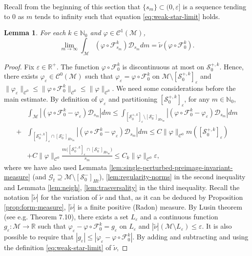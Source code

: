 \documentclass{amsart}
\numberwithin{equation}{section}
\newtheorem{lemma}[theorem]{Lemma}
\newcommand\ve{\varepsilon}
\newcommand\vf{\varphi}
\renewcommand{\le}{\leqslant}
\newcommand\cC{{\mathcal C}}
\newcommand\cF{{\mathcal F}}
\newcommand\cG{{\mathcal G}}
\newcommand\cM{{\mathcal M}}
\newcommand\cS{{\mathcal S}}
\newcommand\bN{{\mathbb N}}
\newcommand\bR{{\mathbb R}}
\newcommand{\Deriv}{\mathcal D}
\begin{document}
Recall from the beginning of this section that \(\{s_m\} \subset (0, \ve] \) is a sequence tending to \(0\) as \(m\) tends to infinity such that equation \eqref{eq:weak-star-limit} holds. 
\begin{lemma}\label{lem:limit-fixed-k}
For each \(k \in \bN_0\) and \(\vf \in \cC^1(\cM)\),
\[
   \lim_{m \to \infty} \int_{\cM} (\vf \circ \cF_{s_{m}}^k) \Deriv_{s_m} dm = \widetilde \nu (\vf \circ \cF_0^k).
\]
\end{lemma}
\begin{proof}
Fix \(\ve \in \bR^+\). The function \(\vf \circ \cF_0^k\) is discontinuous at most on \(\cS_0^{+,k}\). Hence, there exists \(\vf_{\ve} \in \cC^0(\cM)\) such that \(\vf_{\ve} = \vf \circ \cF_0^k\) on \(\cM \setminus [\cS_0^{+,k}]_{\ve}\) and \(\|\vf_{\ve}\|_{\cC^0} \le \|\vf \circ \cF_0^k\|_{\cC^0} \le \|\vf\|_{\cC^0}\). 
We need some considerations before the main estimate. By definition of \(\vf_{\ve}\) and partitioning \([\cS_0^{+,k}]_{\ve}\), for any \(m \in \bN_0\),
\begin{equation}\label{eq:support-lusin}
\begin{split}
& \int_{\cM} |(\vf \circ \cF_{0}^k - \vf_{\ve})\Deriv_{s_m}| dm \le \int_{[\cS_0^{+,k}]_{\ve} \setminus [\cS_0^{-}]_{Hs_m}} |(\vf \circ \cF_{0}^k - \vf_{\ve})\Deriv_{s_m} |dm \\
+& \int_{[\cS_0^{+,k}]_{\ve} \cap [\cS_0^{-}]_{Hs_m}} |(\vf \circ \cF_{0}^k - \vf_{\ve})\Deriv_{s_m}| dm \le C\|\vf\|_{\cC^0} m([\cS_0^{+,k}]_{\ve}) \\
&+ C\|\vf\|_{\cC^0} \frac{ m \bigl([\cS_0^{+,k}]_{\ve} \cap [\cS_0^{-}]_{Hs_m}\bigr)}{s_m} \le C_k \|\vf\|_{\cC^0}\ve, 
\end{split}
\end{equation}
where we have also used Lemmata \ref{lem:single-perturbed-preimage-invariant-measure} (and \(\cG_t \supseteq \cM \setminus [\cS_0^-]_{H t}\)), \ref{lem:regularity-norms} in the second inequality and Lemmata \ref{lem:neigh}, \ref{lem:trasversality} in the third inequality. Recall the notation \(|\widetilde \nu|\) for the variation of \(\widetilde \nu\) and that, as it can be deduced by Proposition \ref{prop:form-measure}, \(|\widetilde \nu|\) is a finite positive (Radon) measure. By Lusin theorem (see e.g. \cite{Folland99} Theorem 7.10), there exists a set \(L_{\ve}\) and a continuous function \(g_{\ve}: \cM \to \bR\) such that \(\vf_{\ve}-\vf \circ \cF_0^k = g_{\ve}\) on \(L_{\ve}\) and \(|\widetilde \nu| (\cM \setminus L_{\ve}) \le \ve\). It is also possible to require that \(|g_{\ve}| \le | \vf_{\ve} - \vf \circ \cF_0^k|\). By adding and subtracting and using the definition \eqref{eq:weak-star-limit} of \(\widetilde \nu\),

\end{proof}
\end{document}
